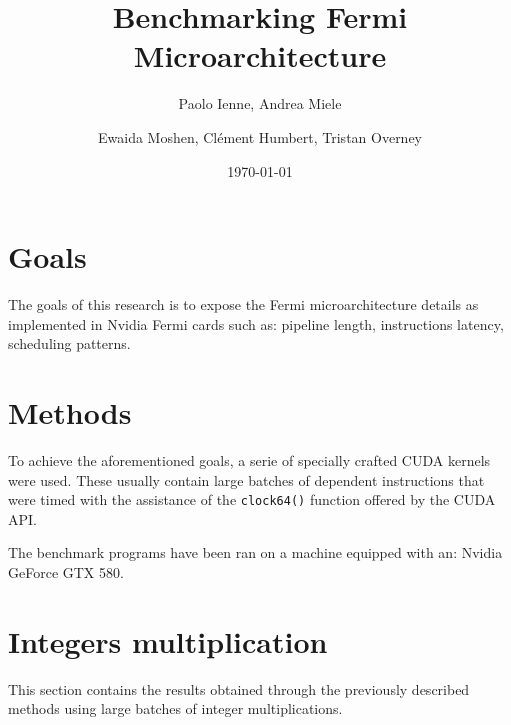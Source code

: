 \documentclass{article}
\begin{document}
\title{Benchmarking Fermi Microarchitecture}
\author{Paolo Ienne, Andrea Miele\and Ewaida Moshen, Cl\'{e}ment Humbert, Tristan Overney}
\date{\today}
\maketitle

\section{Goals}
	The goals of this research is to expose the Fermi microarchitecture details as implemented 
    in Nvidia Fermi cards such as: pipeline length, instructions latency, scheduling patterns.

\section{Methods}
	To achieve the aforementioned goals, a serie of specially crafted CUDA kernels
	were used. These usually contain large batches of dependent instructions that were 
	timed with the assistance of the \texttt{clock64()} function offered by the CUDA API.

	The benchmark programs have been ran on a machine equipped with an: 
	Nvidia GeForce GTX 580.

\section{Integers multiplication}
	This section contains the results obtained through the previously described
	methods using large batches of integer multiplications.
\end{document}
